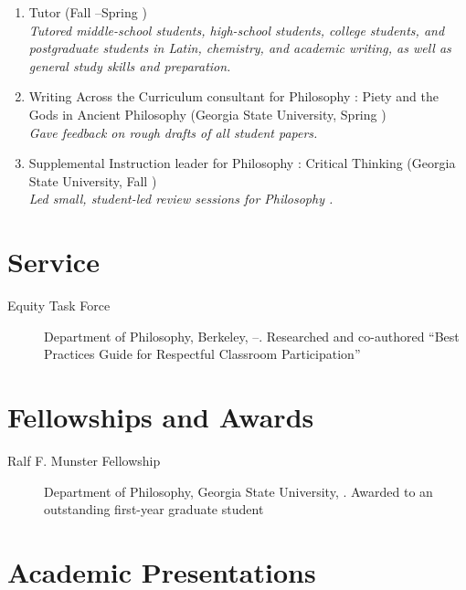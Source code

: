 \documentclass{rhelder3cv}
\begin{document}
\begin{enumerate}
  \item Tutor
    (Fall --Spring )\\
    \emph{%
      \small
      Tutored middle-school students,
      high-school students,
      college students,
      and postgraduate students
      in Latin, chemistry, and academic writing,
      as well as general study skills
      and  preparation.%
    }
  \item Writing Across the Curriculum consultant
    for Philosophy :
    Piety and the Gods in Ancient Philosophy
    (Georgia State University, Spring )\\
    \emph{%
      \small
      Gave feedback on rough drafts of all student papers.%
    }
  \item Supplemental Instruction leader for Philosophy :
    Critical Thinking
    (Georgia State University, Fall )\\
    \emph{%
      Led small, student-led review sessions for Philosophy .%
    }
\end{enumerate}

\section{Service}

\begin{description}
  \item[Equity Task Force] Department of Philosophy,
     Berkeley, --.
    Researched and co-authored
    \enquote{Best Practices Guide for Respectful Classroom Participation}
\end{description}

\section{Fellowships and Awards}

\begin{description}
  \item[Ralf F. Munster Fellowship] Department of Philosophy,
    Georgia State University, .
    Awarded to an outstanding first-year graduate student
\end{description}

\section{Academic Presentations}
\end{document}
